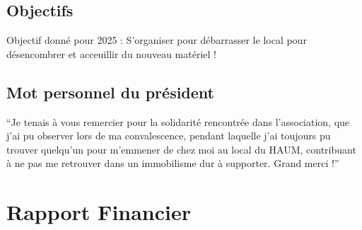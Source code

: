 \documentclass[a4paper, 11pt]{article}
\begin{document}
\begin{appendices}
\subsection{Objectifs}


Objectif donné pour 2025 : S'organiser pour débarrasser le local pour
désencombrer et acceuillir du nouveau matériel !


\subsection{Mot personnel du président}

``Je tenais à vous remercier pour la solidarité rencontrée dans l'association,
que j'ai pu observer lors de ma convalescence, pendant laquelle j'ai toujours pu trouver
quelqu'un pour m'emmener de chez moi au local du HAUM, contribuant à ne pas me retrouver
dans un immobilisme dur à supporter. Grand merci !''

\section{Rapport Financier}
%
\end{appendices}
\end{document}
